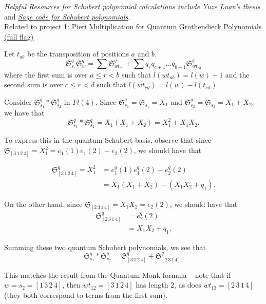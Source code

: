 \textit{Helpful Resources for Schubert polynomial calculations include}
\href{https://www.math.ucdavis.edu/~webfiles/undergrad_thesis/202003_Yuze_Luan_Carlsson_Thesis.pdf}{\textit{Yuze Luan's thesis}} and \href{https://doc.sagemath.org/html/en/reference/combinat/sage/combinat/schubert_polynomial.html}{\textit{Sage code for Schubert polynomials}}. \\

Related to project 1: \href{https://arxiv.org/pdf/2211.01578}{Pieri Multiplication for Quantum Grothendieck Polynomials (full flag)} \\

\begin{theorem*}
Let $t_{ab}$ be the transposition of positions $a$ and $b$.
    \[
        \mathfrak{S}_{s_r}^q \mathfrak{S}_{w}^q = \sum \mathfrak{S}_{wt_{ab}}^q + \sum q_c q_{c+1} \dots q_{b-1}\mathfrak{S}_{wt_{cd}}^q
    \]
    where the first sum is over $a \leq r < b$ such that $l(wt_{ab}) = l(w) + 1$ and the second sum is over $c \leq r < d$ such that $l(wt_{cd}) = l(w) - l(t_{cd})$.
\end{theorem*}


\begin{eg}
Consider $\mathfrak{S}^q_{s_1} \ast \mathfrak{S}^q_{s_2}$ in $Fl(4)$. Since $\mathfrak{S}^q_{s_1} = \mathfrak{S}_{s_1} = X_1$ and $\mathfrak{S}^q_{s_2} = \mathfrak{S}_{s_2} = X_1 + X_2$, we have that
\[
    \mathfrak{S}^q_{s_1} \ast \mathfrak{S}^q_{s_2} = X_1(X_1 + X_2) = X_1^2 + X_1X_2.
\]

To express this in the quantum Schubert basis, observe that since $\mathfrak{S}_{[3\,1\,2\,4]} = X_1^2 = e_1(1)e_1(2) - e_2(2)$, we should have that

\begin{align*}
\mathfrak{S}^q_{[3\,1\,2\,4]} = X_1^2 &= e^q_1(1)e^q_1(2) - e^q_2(2) \\
&= X_1(X_1 + X_2) - (X_1X_2 + q_1).
\end{align*}

On the other hand, since $\mathfrak{S}_{[2\,3\,1\,4]} = X_1X_2 = e_2(2)$, we should have that
\begin{align*}
    \mathfrak{S}^q_{[2\,3\,1\,4]} &= e^q_2(2) \\
    &= X_1X_2 + q_1.
\end{align*}

Summing these two quantum Schubert polynomials, we see that
\[
    \boxed{\mathfrak{S}^q_{s_1} \ast \mathfrak{S}^q_{s_2} = \mathfrak{S}^q_{[3\,1\,2\,4]} + \mathfrak{S}^q_{[2\,3\,1\,4]}}.
\]

This matches the result from the Quantum Monk formula -- note that if $w = s_2 = [1\,3\,2\,4]$, then $wt_{12} = [3\,1\,2\,4]$ has length $2$, as does $wt_{13} = [2\,3\,1\,4]$ (they both correspond to terms from the first sum).
\end{eg}


